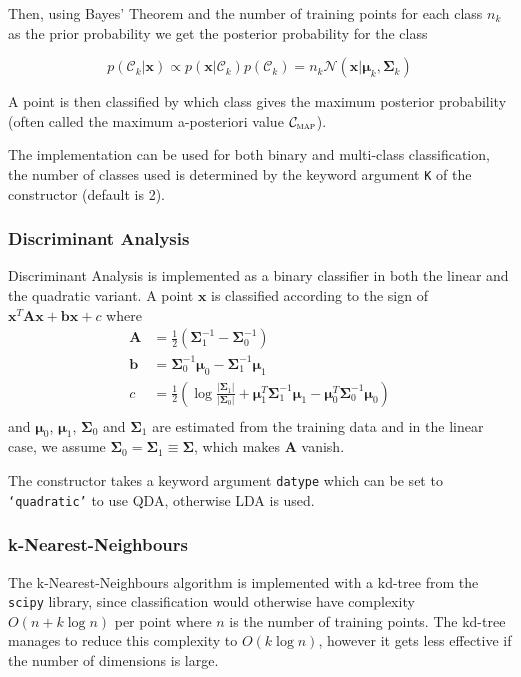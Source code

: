 \documentclass[a4paper]{article}
\begin{document}
Then, using Bayes' Theorem and the number of training points for each class $n_k$ as the prior probability we get the posterior probability for the class

\[ p(\mathcal{C}_k | \mathbf{x}) \propto p(\mathbf{x} | \mathcal{C}_k) p(\mathcal{C}_k) = n_k \mathcal{N}(\mathbf{x} | \bm{\mu}_k, \bm{\Sigma}_k)\]

A point is then classified by which class gives the maximum posterior probability (often called the maximum a-posteriori value $\mathcal{C}_\textsc{map}$).

The implementation can be used for both binary and multi-class classification, the number of classes used is determined by the keyword argument \texttt{K} of the constructor (default is 2).
    
\subsubsection{Discriminant Analysis}
Discriminant Analysis is implemented as a binary classifier in both the linear and the quadratic variant. A point $\mathbf{x}$ is classified according to the sign of $\mathbf{x}^T\mathbf{Ax} + \mathbf{bx} + c$ where
\begin{align*}
\mathbf{A} &= \frac{1}{2} \left(\bm{\Sigma}_1^{-1} - \bm{\Sigma}_0^{-1}\right) \\
\mathbf{b} &= \bm{\Sigma}_0^{-1}\bm{\mu}_0 - \bm{\Sigma}_1^{-1}\bm{\mu}_1 \\
c &= \frac{1}{2} \left( \log\frac{|\bm{\Sigma}_1|}{|\bm{\Sigma}_0|} + \bm{\mu}_1^T\bm{\Sigma}_1^{-1}\bm{\mu}_1 - \bm{\mu}_0^T\bm{\Sigma}_0^{-1}\bm{\mu}_0 \right) \\
\end{align*}
and $\bm{\mu}_0$, $\bm{\mu}_1$, $\bm{\Sigma}_0$ and $\bm{\Sigma}_1$ are estimated from the training data and in the linear case, we assume $\bm{\Sigma}_0 = \bm{\Sigma}_1 \equiv \bm{\Sigma}$, which makes $\mathbf{A}$ vanish.

The constructor takes a keyword argument \texttt{datype} which can be set to \texttt{`quadratic'} to use QDA, otherwise LDA is used.

\subsubsection{k-Nearest-Neighbours}
The k-Nearest-Neighbours algorithm is implemented with a kd-tree from the \texttt{scipy} library, since classification would otherwise have complexity $O(n + k \log n)$ per point where $n$ is the number of training points. The kd-tree manages to reduce this complexity to $O(k \log n)$, however it gets less effective if the number of dimensions is large.
\end{document}
